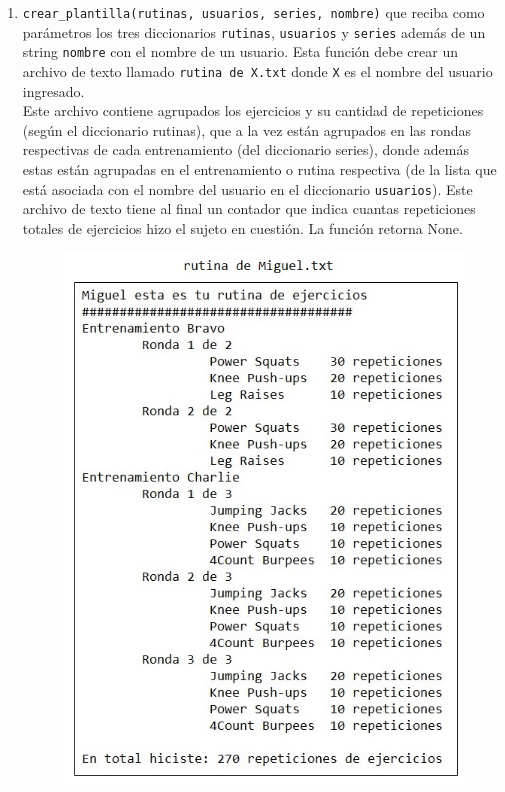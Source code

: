 \begin{enumerate}
    \item \texttt{crear\_plantilla(rutinas, usuarios, series, nombre)} que reciba como parámetros los tres diccionarios \texttt{rutinas}, \texttt{usuarios} y \texttt{series} además de un string \texttt{nombre} con el nombre de un usuario. Esta función debe crear un archivo de texto llamado \texttt{rutina de X.txt} donde \texttt{X} es el nombre del usuario ingresado. \\Este archivo contiene agrupados los ejercicios y su cantidad de repeticiones (según el diccionario rutinas), que a la vez están agrupados en las rondas respectivas de cada entrenamiento (del diccionario series), donde además estas están agrupadas en el entrenamiento o rutina respectiva (de la lista que está asociada con el nombre del usuario en el diccionario \texttt{usuarios}). Este archivo de texto tiene al final un contador que indica cuantas repeticiones totales de ejercicios hizo el sujeto en cuestión. La función retorna None.
    \begin{figure}[H]
        \centering
        \includegraphics{Imagenes/planilla.jpg}
    \end{figure}

\end{enumerate}

